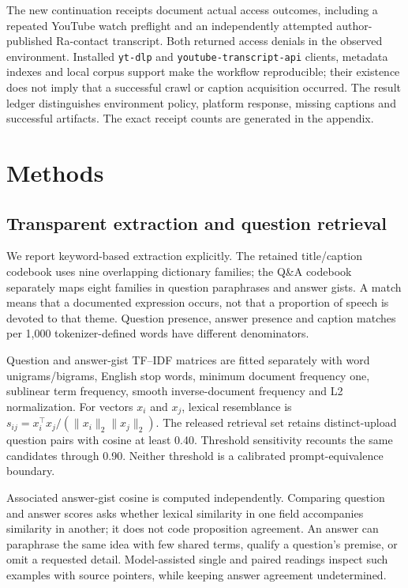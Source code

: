 The new continuation receipts document actual access outcomes, including a repeated YouTube watch preflight and an independently attempted author-published Ra-contact transcript. Both returned access denials in the observed environment. Installed \texttt{yt-dlp} and \texttt{youtube-transcript-api} clients, metadata indexes and local corpus support make the workflow reproducible; their existence does not imply that a successful crawl or caption acquisition occurred. The result ledger distinguishes environment policy, platform response, missing captions and successful artifacts. The exact receipt counts are generated in the appendix.

\section{Methods}
\subsection{Transparent extraction and question retrieval}
We report keyword-based extraction explicitly. The retained title/caption codebook uses nine overlapping dictionary families; the Q\&A codebook separately maps eight families in question paraphrases and answer gists. A match means that a documented expression occurs, not that a proportion of speech is devoted to that theme. Question presence, answer presence and caption matches per 1,000 tokenizer-defined words have different denominators.

Question and answer-gist TF--IDF matrices are fitted separately with word unigrams/bigrams, English stop words, minimum document frequency one, sublinear term frequency, smooth inverse-document frequency and L2 normalization. For vectors $x_i$ and $x_j$, lexical resemblance is $s_{ij}=x_i^\top x_j/(\lVert x_i\rVert_2\lVert x_j\rVert_2)$. The released retrieval set retains distinct-upload question pairs with cosine at least 0.40. Threshold sensitivity recounts the same candidates through 0.90. Neither threshold is a calibrated prompt-equivalence boundary.

Associated answer-gist cosine is computed independently. Comparing question and answer scores asks whether lexical similarity in one field accompanies similarity in another; it does not code proposition agreement. An answer can paraphrase the same idea with few shared terms, qualify a question's premise, or omit a requested detail. Model-assisted single and paired readings inspect such examples with source pointers, while keeping answer agreement undetermined.

